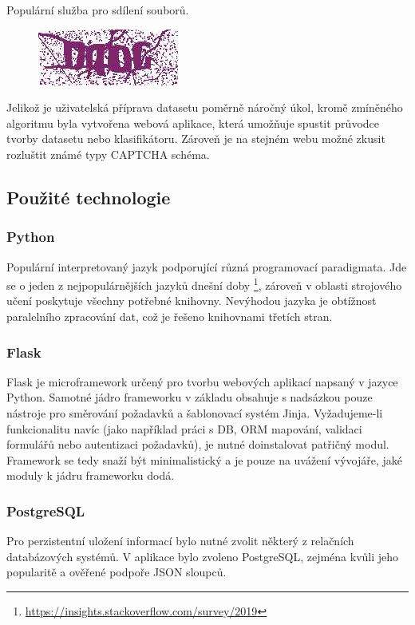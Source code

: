 \documentclass[
  field=ainfp,
  master=true,
  biblatex,
  sourcecodes=false,
  theorems=false,
  glossaries,
  index
]{kidiplom}
\begin{document}
\begin{description}[align=left]
\item  [ulozto.cz] Populární služba pro sdílení souborů.
\begin{figure}[H]
  \centering
  \includegraphics{images/ulozto.jpg}
\end{figure}
\end{description}


Jelikož je uživatelská příprava datasetu poměrně náročný úkol, kromě zmíněného algoritmu byla vytvořena webová aplikace, která umožňuje spustit průvodce tvorby datasetu nebo klasifikátoru. Zároveň je na stejném webu možné zkusit rozluštit známé typy CAPTCHA schéma. 


\subsection{Použité technologie}
\subsubsection*{Python}
Populární interpretovaný jazyk podporující různá programovací paradigmata. Jde  se o jeden z nejpopulárnějších jazyků dnešní doby \footnote{\url{https://insights.stackoverflow.com/survey/2019}}, zároveň v oblasti strojového učení poskytuje všechny potřebné knihovny. Nevýhodou jazyka je obtížnost paralelního zpracování dat, což je řešeno knihovnami třetích stran.

\subsubsection*{Flask}
Flask je microframework určený pro tvorbu webových aplikací napsaný v jazyce Python. Samotné jádro frameworku v základu obsahuje s nadsázkou pouze nástroje pro směrování požadavků a šablonovací systém Jinja. Vyžadujeme-li funkcionalitu navíc (jako například práci s DB, ORM mapování, validaci formulářů nebo autentizaci požadavků), je nutné doinstalovat patřičný modul. Framework se tedy snaží být minimalistický a je pouze na uvážení vývojáře, jaké moduly k jádru frameworku dodá. 
\subsubsection*{PostgreSQL}
Pro perzistentní uložení informací bylo nutné zvolit některý z relačních databázových systémů. V aplikace bylo zvoleno PostgreSQL, zejména kvůli jeho popularitě a ověřené podpoře JSON sloupců. 
\end{document}
